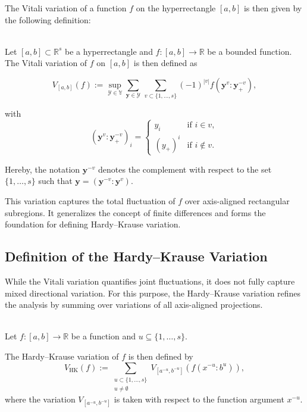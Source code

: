 The Vitali variation of a function $f$ on the hyperrectangle $[a,b]$ is then
given by the following definition:

\begin{definition} \ \\
Let $[a,b] \subset \mathbb{R}^s$ be a hyperrectangle and $f \colon [a,b] \to \mathbb{R}$ be a bounded function. The Vitali variation of $f$ on $[a,b]$ is then defined as

\begin{equation*}
    V_{[a,b]}(f) := \sup\limits_{\mathcal{Y} \in \mathbb{Y}} \sum_{\mathbf{y} \in \mathcal{Y}}\, \sum_{v \subset \{1,\dots,s\}} (-1)^{|v|} f(\mathbf{y}^v : \mathbf{y}^{-v}_+),
\end{equation*}

with
\begin{equation*}
  (\mathbf{y}^v : \mathbf{y}^{-v}_+)_i = \begin{cases}
    y_i & \text{if } i \in v, \\
    (y_+)^i & \text{if } i \notin v.
  \end{cases}
\end{equation*}

\end{definition}

Hereby, the notation $\mathbf{y}^{-v}$ denotes the complement with respect to
the set $\{1,\dots,s\}$ such that
$\mathbf{y}=(\mathbf{y}^{-v}\colon\mathbf{y}^{v})$.

This variation captures the total fluctuation of $f$ over axis-aligned
rectangular subregions. It generalizes the concept of finite differences and
forms the foundation for defining Hardy--Krause variation.


  \subsection{Definition of the Hardy--Krause Variation}
  \label{sec:hk-variation}

While the Vitali variation quantifies joint fluctuations, it does not fully capture mixed directional variation. For this purpose, the Hardy--Krause variation refines the analysis by summing over variations of all axis-aligned projections.

\begin{definition} \ \\
\label{def:hk-variation}
Let $f \colon [a,b] \to \mathbb{R}$ be a function and $u \subseteq \{1,\dots,s\}$.

The Hardy--Krause variation of $f$ is then defined by
\begin{equation*}
  V_{\mathrm{HK}}(f) := \sum_{\substack{u \subset \{1,\dots,s\}\\ u \neq \emptyset}} V_
  {[a^{-u}, b^{-u}]}(f(x^{-u}: b^u)),
\end{equation*}
where the variation $V_{[a^{-u}, b^{-u}]}$ is taken with respect to the function
argument $x^{-u}$.
\end{definition}

